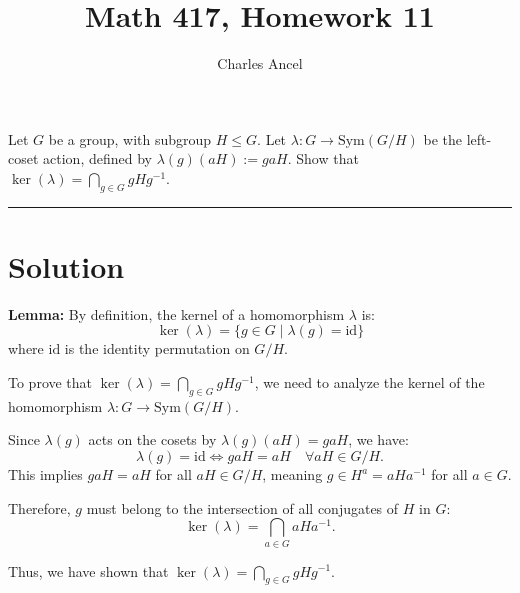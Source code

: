 \documentclass[12pt]{amsart}
\title{Math 417, Homework 11}
\author{Charles Ancel}
\theoremstyle{definition}
\numberwithin{equation}{section}
\begin{document}
\maketitle

\begin{exercise}{1} Let \(G\) be a group, with subgroup \(H \leq G\). Let \(\lambda : G \rightarrow \text{Sym}(G/H)\) be the left-coset action, defined by \(\lambda(g)(aH):= gaH\). Show that \(\ker(\lambda)= \bigcap_{g\in G}gHg^{-1}\).

    \noindent\rule{\linewidth}{1pt}

    \section*{Solution}
    
    \noindent \textbf{Lemma:} By definition, the kernel of a homomorphism \(\lambda\) is:
    \[
    \ker(\lambda) = \{g \in G \mid \lambda(g) = \text{id}\}
    \]
    where \(\text{id}\) is the identity permutation on \(G/H\).

    To prove that \(\ker(\lambda)= \bigcap_{g\in G}gHg^{-1}\), we need to analyze the kernel of the homomorphism \(\lambda : G \rightarrow \text{Sym}(G/H)\).

    Since \(\lambda(g)\) acts on the cosets by \(\lambda(g)(aH) = gaH\), we have:
    \[
    \lambda(g) = \text{id} \iff gaH = aH \quad \forall aH \in G/H.
    \]
    This implies \(gaH = aH\) for all \(aH \in G/H\), meaning \(g \in H^a = aHa^{-1}\) for all \(a \in G\).

    Therefore, \(g\) must belong to the intersection of all conjugates of \(H\) in \(G\):
    \[
    \ker(\lambda) = \bigcap_{a \in G} aHa^{-1}.
    \]

    Thus, we have shown that \(\ker(\lambda)= \bigcap_{g\in G}gHg^{-1}\).
\end{exercise}
\newpage
\end{document}
